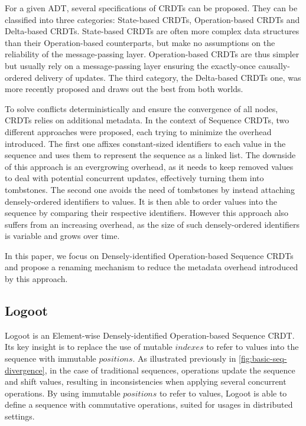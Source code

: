 \documentclass{article}
\theoremstyle{definition}
\begin{document}
For a given \ac{ADT}, several specifications of \acp{CRDT} can be proposed.
They can be classified into three categories: State-based \acp{CRDT}, Operation-based \acp{CRDT} and Delta-based \acp{CRDT}.
State-based \acp{CRDT} are often more complex data structures than their Operation-based counterparts, but make no assumptions on the reliability of the message-passing layer.
Operation-based \acp{CRDT} are thus simpler but usually rely on a message-passing layer ensuring the exactly-once causally-ordered delivery of updates.
The third category, the Delta-based \acp{CRDT} one, was more recently proposed and draws out the best from both worlds.

To solve conflicts deterministically and ensure the convergence of all nodes, \acp{CRDT} relies on additional metadata.
In the context of Sequence \acp{CRDT}, two different approaches were proposed, each trying to minimize the overhead introduced.
The first one affixes constant-sized identifiers to each value in the sequence and uses them to represent the sequence as a linked list.
The downside of this approach is an evergrowing overhead, as it needs to keep removed values to deal with potential concurrent updates, effectively turning them into tombstones.
The second one avoids the need of tombstones by instead attaching densely-ordered identifiers to values.
It is then able to order values into the sequence by comparing their respective identifiers.
However this approach also suffers from an increasing overhead, as the size of such densely-ordered identifiers is variable and grows over time.

In this paper, we focus on Densely-identified Operation-based Sequence \acp{CRDT} and propose a renaming mechanism to reduce the metadata overhead introduced by this approach.

\subsection{Logoot}

Logoot \cite{WeissICDCS09} is an Element-wise Densely-identified Operation-based Sequence \ac{CRDT}.
Its key insight is to replace the use of mutable $indexes$ to refer to values into the sequence with immutable $positions$.
As illustrated previously in \autoref{fig:basic-seq-divergence}, in the case of traditional sequences, operations update the sequence and shift values, resulting in inconsistencies when applying several concurrent operations.
By using immutable $positions$ to refer to values, Logoot is able to define a sequence with commutative operations, suited for usages in distributed settings.
\end{document}
